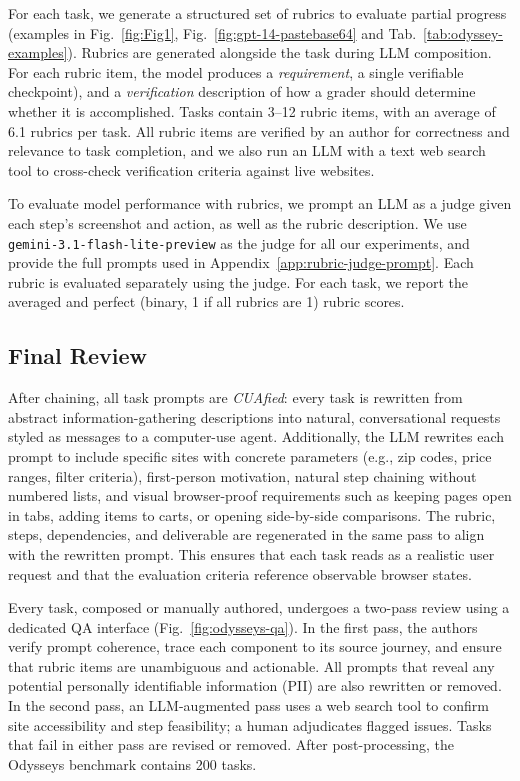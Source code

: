 \documentclass{article}
\theoremstyle{plain}
\theoremstyle{definition}
\theoremstyle{remark}
\def\odysseys{Odysseys\xspace}
\begin{document}
For each task, we generate a structured set of rubrics to evaluate partial progress (examples in Fig.~\ref{fig:Fig1}, Fig.~\ref{fig:gpt-14-pastebase64} and Tab.~\ref{tab:odyssey-examples}).
Rubrics are generated alongside the task during LLM composition.
For each rubric item, the model produces a \textit{requirement}, a single verifiable checkpoint), and  a \textit{verification} description of how a grader should determine whether it is accomplished.
Tasks contain 3--12 rubric items, with an average of 6.1 rubrics per task. All rubric items are verified by an author for correctness and relevance to task completion, and we also run an LLM with a text web search tool to cross-check verification criteria against live websites.

To evaluate model performance with rubrics, we prompt an LLM as a judge given each step's screenshot and action, as well as the rubric description. We use \texttt{gemini-3.1-flash-lite-preview} as the judge for all our experiments, and provide the full prompts used in Appendix~\ref{app:rubric-judge-prompt}. Each rubric is evaluated separately using the judge. For each task, we report the averaged and perfect (binary, 1 if all rubrics are 1) rubric scores.

\subsection{Final Review}
After chaining, all task prompts are \textit{CUAfied}: every task is rewritten from abstract
information-gathering descriptions into natural, conversational requests styled as messages
to a computer-use agent. Additionally, the LLM rewrites each prompt to include specific sites with concrete parameters (e.g., zip codes, price ranges, filter criteria), first-person motivation, natural
step chaining without numbered lists, and visual browser-proof requirements such as keeping
pages open in tabs, adding items to carts, or opening side-by-side comparisons. The rubric,
steps, dependencies, and deliverable are regenerated in the same pass to align with the
rewritten prompt. This ensures that  each task reads as a realistic user request and that the evaluation criteria reference observable
browser states.

Every task, composed or manually authored, undergoes a two-pass review using a dedicated QA interface (Fig.~\ref{fig:odysseys-qa}). In the first pass, the authors verify prompt coherence, trace each component to its source journey, and ensure that rubric items are unambiguous and actionable. All prompts that reveal any potential personally identifiable information (PII) are also rewritten or removed. In the second pass, an LLM-augmented pass uses a web search tool to confirm site accessibility and step feasibility; a human adjudicates flagged issues. Tasks that fail in either pass are revised or removed.
After post-processing, the \odysseys benchmark contains 200 tasks.
\end{document}
